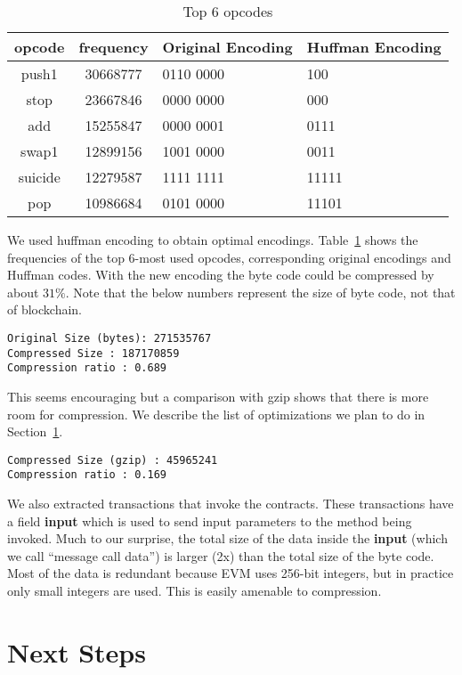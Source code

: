 \documentclass[12pt]{article}
\begin{document}
\begin{table}[H]
\centering
\begin{tabular}{c | c | p{4cm} | p{4cm} }
	opcode & frequency & {Original Encoding} & {Huffman Encoding}  \\
\hline
push1 & 30668777 & 0110 0000 & 100\\
stop & 23667846 & 0000 0000 & 000 \\
add  & 15255847 & 0000 0001  & 0111\\
swap1  & 12899156 &1001 0000 & 0011 \\
suicide & 12279587 &1111 1111 & 11111 \\
pop    & 10986684 &0101 0000 & 11101 \\
\hline
\end{tabular}
\caption{Top 6 opcodes}
\label{tab:freqopcodes}
\end{table}

We used huffman encoding to obtain optimal encodings.
Table~\ref{tab:freqopcodes} shows the frequencies of the top 6-most used opcodes, corresponding original encodings and Huffman codes.
With the new encoding the byte code could be compressed by about $31\%$. 
Note that the below numbers represent the size of byte code, not that of blockchain.

\begin{lstlisting}
Original Size (bytes): 271535767
Compressed Size : 187170859
Compression ratio : 0.689
\end{lstlisting}

This seems encouraging but a comparison with gzip shows that there is more room for compression. We describe the list of optimizations we plan to
do in Section~\ref{sec:next}.
\begin{lstlisting}
Compressed Size (gzip) : 45965241
Compression ratio : 0.169
\end{lstlisting}

We also extracted transactions that invoke the contracts. 
These transactions have a field \textbf{input} which is used to send input parameters to the method being invoked.
Much to our surprise, the total size of the data inside the \textbf{input} (which we call ``message call data'') is larger (2x) 
than the total size of the byte code. Most of the data is redundant because EVM uses 256-bit integers, but in practice only small integers are used.
This is easily amenable to compression.

\section{Next Steps}\label{sec:next}
\end{document}
